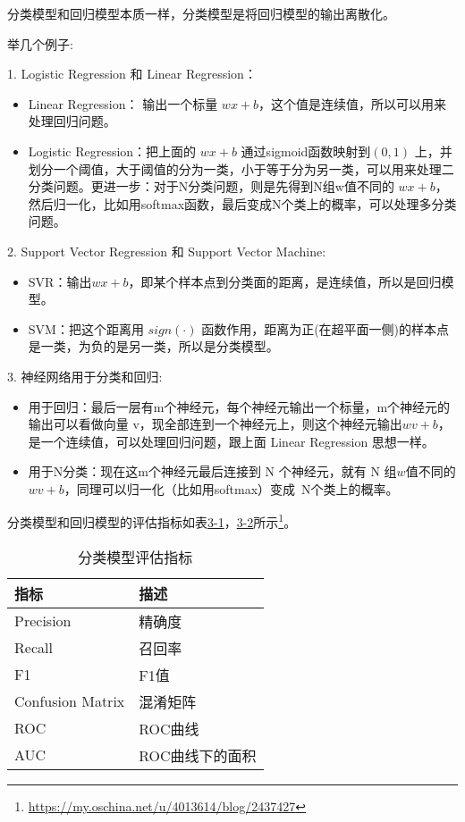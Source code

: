分类模型和回归模型本质一样，分类模型是将回归模型的输出离散化。

举几个例子:

1. Logistic Regression 和 Linear Regression：

\begin{itemize}
    \item Linear Regression： 输出一个标量 $wx+b$，这个值是连续值，所以可以用来处理回归问题。
    \item Logistic Regression：把上面的 $wx+b$ 通过sigmoid函数映射到$(0,1)$ 上，并划分一个阈值，大于阈值的分为一类，小于等于分为另一类，可以用来处理二分类问题。更进一步：对于N分类问题，则是先得到N组w值不同的 $wx+b$，然后归一化，比如用softmax函数，最后变成N个类上的概率，可以处理多分类问题。 \\
\end{itemize}

2. Support Vector Regression 和 Support Vector Machine:

\begin{itemize}
    \item SVR：输出$wx+b$，即某个样本点到分类面的距离，是连续值，所以是回归模型。
    \item SVM：把这个距离用 $sign(\cdot)$ 函数作用，距离为正(在超平面一侧)的样本点是一类，为负的是另一类，所以是分类模型。\\
\end{itemize}

3. 神经网络用于分类和回归:

\begin{itemize}
    \item 用于回归：最后一层有m个神经元，每个神经元输出一个标量，m个神经元的输出可以看做向量 v，现全部连到一个神经元上，则这个神经元输出$wv+b$，是一个连续值，可以处理回归问题，跟上面 Linear Regression 思想一样。
    \item 用于N分类：现在这m个神经元最后连接到 N 个神经元，就有 N 组$w$值不同的$wv+b$，同理可以归一化（比如用softmax）变成 N个类上的概率。
\end{itemize}

分类模型和回归模型的评估指标如表\href{table:3-1}{3-1}，\href{table:3-2}{3-2}所示\footnote{\url{https://my.oschina.net/u/4013614/blog/2437427}}。

\begin{table}[]
\centering
\caption{分类模型评估指标}
\label{table:3-1}
\begin{tabular}{|l|l|}
\hline
\textbf{指标}          & \textbf{描述}    \\ \hline
Precision            & 精确度            \\ \hline
Recall               & 召回率            \\ \hline
F1                   & F1值            \\ \hline
Confusion Matrix     & 混淆矩阵           \\ \hline
ROC                  & ROC曲线          \\ \hline
AUC                  & ROC曲线下的面积      \\ \hline
\end{tabular}
\end{table}

